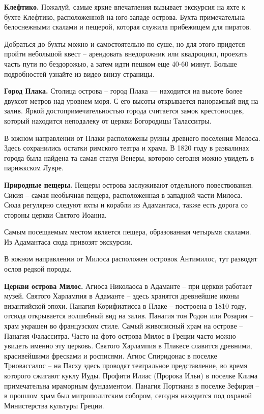 \textbf{ Клефтико.}
Пожалуй, самые яркие впечатления вызывает экскурсия на яхте к бухте Клефтико, расположенной на юго-западе острова. Бухта примечательна белоснежными скалами и пещерой, которая служила прибежищем для пиратов.

Добраться до бухты можно и самостоятельно по суше, но для этого придется пройти небольшой квест – арендовать внедорожник или квадроцикл, проехать часть пути по бездорожью, а затем идти пешком еще 40-60 минут. Больше подробностей узнайте из видео внизу страницы.

\textbf{Город Плака.}
Столица острова – город Плака — находится на высоте более двухсот метров над уровнем моря. С его высоты открывается панорамный вид на залив. Яркой достопримечательностью города считается замок крестоносцев, который находится неподалеку от церкви Богородицы Таласситры.

В южном направлении от Плаки расположены руины древнего поселения Мелоса. Здесь сохранились остатки римского театра и храма. В 1820 году в развалинах города была найдена та самая статуя Венеры, которою сегодня можно увидеть в парижкском Лувре.

\textbf{Природные пещеры.}
Пещеры острова заслуживают отдельного повествования. Сикия – самая необычная пещера, расположенная в западной части Милоса. Сюда регулярно следуют яхты и корабли из Адамантаса, также есть дорога со стороны церкви Святого Иоанна.

Самым посещаемым местом является пещера, образованная четырьмя скалами. Из Адамантаса сюда привозят экскурсии.

В южном направлении от Милоса расположен островок Антимилос, тут разводят ослов редкой породы.

\textbf{Церкви острова Милос.}
Агиоса Николаоса в Адаманте – при церкви работает музей. Святого Харлампия в Адаманте – здесь хранятся древнейшие иконы византийской эпохи. Панагия Корифиатисса в Плаке – построена в 1810 году, отсюда открывается волшебный вид на залив. Панагия тон Родон или Розария – храм украшен во французском стиле. Самый живописный храм на острове – Панагия Фаласситра. Часто на фото острова Милос в Греции часто можно увидеть именно эту церковь. Святого Харлампия в Плакесе славится древними, красивейшими фресками и росписями. Агиос Спиридонас в поселке Триовассалос – на Пасху здесь проводят театральное представление, во время которого сжигают куклу Иуды.
Профити Илиас (Пророка Ильи) в поселке Клима примечательна мраморным фундаментом.
Панагия Портиани в поселке Зефирия – в прошлом храм был митрополитским собором, сегодня находится под охраной Министерства культуры Греции.

